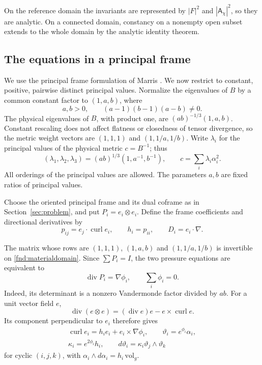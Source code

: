 \documentclass[11pt,a4paper]{article}
\numberwithin{equation}{section}
\theoremstyle{plain}
\theoremstyle{definition}
\theoremstyle{remark}
\begin{document}
On the reference domain the invariants are represented by $|F|^2$ and $|\mathsf A_\chi|^2$, so they are analytic. On a connected domain, constancy on a nonempty open subset extends to the whole domain by the analytic identity theorem.

\subsection{The equations in a principal frame}
We use the principal frame formulation of Marris
\cite{Marris1975,Marris1982}.
We now restrict to constant, positive, pairwise distinct principal values. Normalize the eigenvalues of $B$ by a common constant factor to $(1,a,b)$, where
\begin{equation}\label{fnd:materialdomain}
a,b>0,\qquad (a-1)(b-1)(a-b)\ne0.
\end{equation}
The physical eigenvalues of $B$, with product one, are
$(ab)^{-1/3}(1,a,b)$. Constant rescaling does not affect flatness
or closedness of tensor divergence, so the metric weight vectors are $(1,1,1)$ and $(1,1/a,1/b)$. Write $\lambda_i$ for the principal values of the physical metric $c=B^{-1}$; thus
\[
 (\lambda_1,\lambda_2,\lambda_3)=(ab)^{1/3}(1,a^{-1},b^{-1}),
 \qquad c=\sum_i\lambda_i\alpha_i^2.
\]
All orderings of the principal values are allowed. The parameters
$a,b$ are fixed ratios of principal values.

Choose the oriented principal frame and its dual coframe as in
Section~\ref{sec:problem}, and put $P_i=e_i\otimes e_i$.
Define the frame coefficients and directional derivatives by
\begin{equation}\label{intro:contact}
 p_{ij}=e_j\cdot\operatorname{curl}e_i,\qquad
 h_i=p_{ii},\qquad D_i=e_i\cdot\nabla.
\end{equation}

The matrix whose rows are $(1,1,1)$, $(1,a,b)$ and $(1,1/a,1/b)$ is invertible on \eqref{fnd:materialdomain}. Since $\sum P_i=I$, the two pressure equations are equivalent to
\begin{equation}\label{fnd:projectors}
\operatorname{div}P_i=\nabla\phi_i,\qquad \sum_i\phi_i=0.
\end{equation}
Indeed, its determinant is a nonzero Vandermonde factor divided by $ab$. For a unit vector field $e$,
\[
\operatorname{div}(e\otimes e)=(\operatorname{div}e)e-e\times\operatorname{curl}e.
\]
Its component perpendicular to $e_i$ therefore gives
\begin{equation}\label{fnd:pressureframe}
\begin{gathered}
\operatorname{curl}e_i=h_ie_i+e_i\times\nabla\phi_i,
\qquad \vartheta_i=e^{\phi_i}\alpha_i,\\
\kappa_i=e^{2\phi_i}h_i,\qquad
d\vartheta_i=\kappa_i\vartheta_j\wedge\vartheta_k
\end{gathered}
\end{equation}
for cyclic $(i,j,k)$, with $\alpha_i\wedge d\alpha_i=h_i\,\mathrm{vol}_g$.
\end{document}
